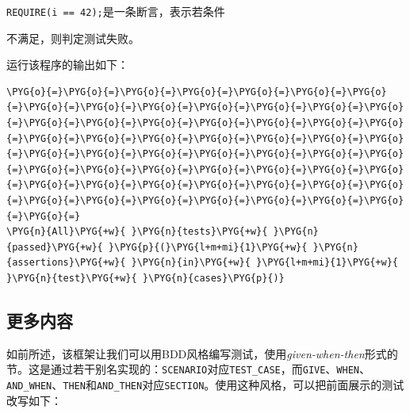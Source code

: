 
\texttt{REQUIRE(\allowbreak{}i == 42)\allowbreak{};}是一条断言，表示若条件



不满足，则判定测试失败。



运行该程序的输出如下：



\begin{codeblockbg}
\begin{Verbatim}[commandchars=\\\{\},breaklines=true,breakanywhere=true,fontsize=\codefont,xleftmargin=17bp]
\PYG{o}{=}\PYG{o}{=}\PYG{o}{=}\PYG{o}{=}\PYG{o}{=}\PYG{o}{=}\PYG{o}{=}\PYG{o}{=}\PYG{o}{=}\PYG{o}{=}\PYG{o}{=}\PYG{o}{=}\PYG{o}{=}\PYG{o}{=}\PYG{o}{=}\PYG{o}{=}\PYG{o}{=}\PYG{o}{=}\PYG{o}{=}\PYG{o}{=}\PYG{o}{=}\PYG{o}{=}\PYG{o}{=}\PYG{o}{=}\PYG{o}{=}\PYG{o}{=}\PYG{o}{=}\PYG{o}{=}\PYG{o}{=}\PYG{o}{=}\PYG{o}{=}\PYG{o}{=}\PYG{o}{=}\PYG{o}{=}\PYG{o}{=}\PYG{o}{=}\PYG{o}{=}\PYG{o}{=}\PYG{o}{=}\PYG{o}{=}\PYG{o}{=}\PYG{o}{=}\PYG{o}{=}\PYG{o}{=}\PYG{o}{=}\PYG{o}{=}\PYG{o}{=}\PYG{o}{=}\PYG{o}{=}\PYG{o}{=}\PYG{o}{=}\PYG{o}{=}\PYG{o}{=}\PYG{o}{=}\PYG{o}{=}\PYG{o}{=}\PYG{o}{=}
\PYG{n}{All}\PYG{+w}{ }\PYG{n}{tests}\PYG{+w}{ }\PYG{n}{passed}\PYG{+w}{ }\PYG{p}{(}\PYG{l+m+mi}{1}\PYG{+w}{ }\PYG{n}{assertions}\PYG{+w}{ }\PYG{n}{in}\PYG{+w}{ }\PYG{l+m+mi}{1}\PYG{+w}{ }\PYG{n}{test}\PYG{+w}{ }\PYG{n}{cases}\PYG{p}{)}
\end{Verbatim}
\end{codeblockbg}



\subsection{更多内容}



如前所述，该框架让我们可以用BDD风格编写测试，使用\textit{given-when-then}形式的节。这是通过若干别名实现的：\texttt{SCENARIO}对应\texttt{TEST\_\allowbreak{}CASE}，而\texttt{GIVE}、\texttt{WHEN}、\texttt{AND\_\allowbreak{}WHEN}、\texttt{THEN}和\texttt{AND\_\allowbreak{}THEN}对应\texttt{SECTION}。使用这种风格，可以把前面展示的测试改写如下：



